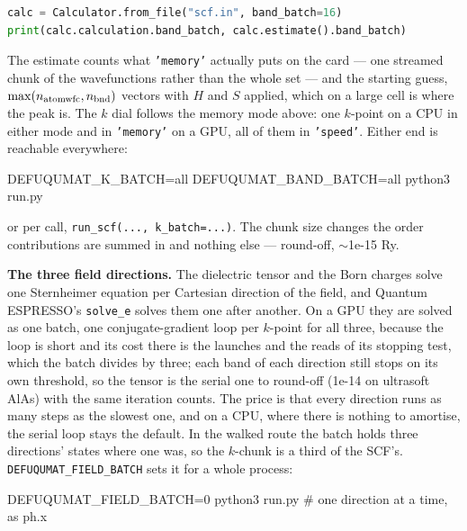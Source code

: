 \documentclass[11pt,a4paper]{article}
\newcommand{\qe}{Quantum ESPRESSO}
\newcommand{\code}[1]{\texttt{\small #1}}
\begin{document}
\begin{lstlisting}[language=Python]
calc = Calculator.from_file("scf.in", band_batch=16)
print(calc.calculation.band_batch, calc.estimate().band_batch)
\end{lstlisting}

\noindent The estimate counts what \code{'memory'} actually puts on the card ---
one streamed chunk of the wavefunctions rather than the whole set --- and the
starting guess, $\max(n_{\rm atomwfc}, n_{\rm bnd})$ vectors with $H$ and $S$
applied, which on a large cell is where the peak is. The $k$ dial follows the memory mode above: one $k$-point on a CPU in
either mode and in \code{'memory'} on a GPU, all of them in \code{'speed'}.
Either end is reachable everywhere:

\begin{shcode}
DEFUQUMAT_K_BATCH=all DEFUQUMAT_BAND_BATCH=all python3 run.py
\end{shcode}

or per call, \code{run\_scf(..., k\_batch=...)}. The chunk size changes the order
contributions are summed in and nothing else --- round-off, $\sim$1e-15 Ry.

\textbf{The three field directions.} The dielectric tensor and the Born charges
solve one Sternheimer equation per Cartesian direction of the field, and
\qe's \code{solve\_e} solves them one after another. On a GPU they are solved as
one batch, one conjugate-gradient loop per $k$-point for all three, because the
loop is short and its cost there is the launches and the reads of its stopping
test, which the batch divides by three; each band of each direction still stops
on its own threshold, so the tensor is the serial one to round-off (1e-14 on
ultrasoft AlAs) with the same iteration counts. The price is that every direction
runs as many steps as the slowest one, and on a CPU, where there is nothing to
amortise, the serial loop stays the default. In the walked route the batch holds
three directions' states where one was, so the $k$-chunk is a third of the SCF's.
\code{DEFUQUMAT\_FIELD\_BATCH} sets it for a whole process:

\begin{shcode}
DEFUQUMAT_FIELD_BATCH=0 python3 run.py    # one direction at a time, as ph.x
\end{shcode}
\end{document}
